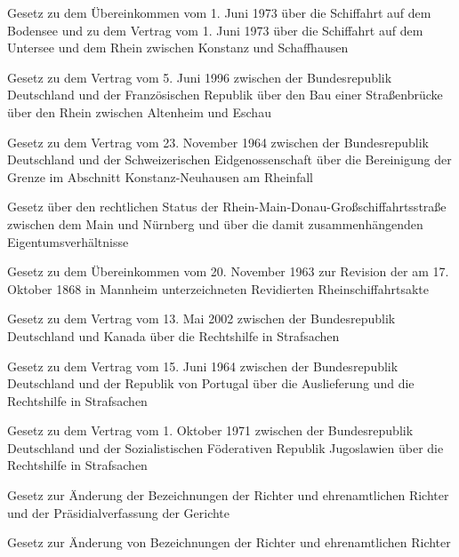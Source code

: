 \item[{RheinBodSeeSchÜbkG}] Gesetz zu dem Übereinkommen vom 1. Juni 1973 über die Schiffahrt auf dem Bodensee und zu dem Vertrag vom 1. Juni 1973 über die Schiffahrt auf dem Untersee und dem Rhein zwischen Konstanz und Schaffhausen

\item[{RheinBrückEschauVtrG}] Gesetz zu dem Vertrag vom 5. Juni 1996 zwischen der Bundesrepublik Deutschland und der Französischen Republik über den Bau einer Straßenbrücke über den Rhein zwischen Altenheim und Eschau

\item[{RheinfallVtrG-CHE}] Gesetz zu dem Vertrag vom 23. November 1964 zwischen der Bundesrepublik Deutschland und der Schweizerischen Eidgenossenschaft über die Bereinigung der Grenze im Abschnitt Konstanz-Neuhausen am Rheinfall

\item[{RheinMainDonSchStrG}] Gesetz über den rechtlichen Status der Rhein-Main-Donau-Großschiffahrtsstraße zwischen dem Main und Nürnberg und über die damit zusammenhängenden Eigentumsverhältnisse

\item[{RheinSchÜbkG}] Gesetz zu dem Übereinkommen vom 20. November 1963 zur Revision der am 17. Oktober 1868 in Mannheim unterzeichneten Revidierten Rheinschiffahrtsakte

\item[{RHiVtrCANG}] Gesetz zu dem Vertrag vom 13. Mai 2002 zwischen der Bundesrepublik Deutschland und Kanada über die Rechtshilfe in Strafsachen

\item[{RHiVtrPRTG}] Gesetz zu dem Vertrag vom 15. Juni 1964 zwischen der Bundesrepublik Deutschland und der Republik von Portugal über die Auslieferung und die Rechtshilfe in Strafsachen

\item[{RHiVtrYUGG}] Gesetz zu dem Vertrag vom 1. Oktober 1971 zwischen der Bundesrepublik Deutschland und der Sozialistischen Föderativen Republik Jugoslawien über die Rechtshilfe in Strafsachen

\item[{RiAmtBezG}] Gesetz zur Änderung der Bezeichnungen der Richter und ehrenamtlichen Richter und der Präsidialverfassung der Gerichte

\item[{RiAmtBezGÄndG}] Gesetz zur Änderung von Bezeichnungen der Richter und ehrenamtlichen Richter

